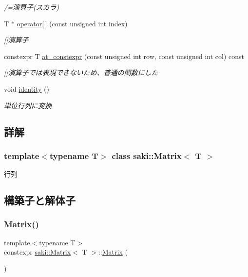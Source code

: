 \begin{DoxyCompactItemize}
\begin{DoxyCompactList}\small\item\em /=演算子(スカラ) \end{DoxyCompactList}\item 
T $\ast$ \mbox{\hyperlink{classsaki_1_1_matrix_ad1fa9ab13d6ab9def73a4ac5bfa15cf4}{operator\mbox{[}$\,$\mbox{]}}} (const unsigned int index)
\begin{DoxyCompactList}\small\item\em \mbox{[}\mbox{]}演算子 \end{DoxyCompactList}\item 
constexpr T \mbox{\hyperlink{classsaki_1_1_matrix_ac9e6609628221255fd9577eceb9ab2af}{at\+\_\+constexpr}} (const unsigned int row, const unsigned int col) const
\begin{DoxyCompactList}\small\item\em \mbox{[}\mbox{]}演算子では表現できないため、普通の関数にした \end{DoxyCompactList}\item 
void \mbox{\hyperlink{classsaki_1_1_matrix_af0c4f3614c29e27eae5fecde22140be8}{identity}} ()
\begin{DoxyCompactList}\small\item\em 単位行列に変換 \end{DoxyCompactList}\end{DoxyCompactItemize}


\subsection{詳解}
\subsubsection*{template$<$typename T$>$\newline
class saki\+::\+Matrix$<$ T $>$}

行列 

\subsection{構築子と解体子}
\mbox{\label{classsaki_1_1_matrix_a820035e9bafc0fa4269c4b94b1ec4f4f}} 
\subsubsection{\texorpdfstring{Matrix()}{Matrix()}\hspace{0.1cm}{\footnotesize\ttfamily [1/5]}}
{\footnotesize\ttfamily template$<$typename T$>$ \\
constexpr \mbox{\hyperlink{classsaki_1_1_matrix}{saki\+::\+Matrix}}$<$ T $>$\+::\mbox{\hyperlink{classsaki_1_1_matrix}{Matrix}} (\begin{DoxyParamCaption}{ }\end{DoxyParamCaption})\hspace{0.3cm}{\ttfamily [inline]}}



